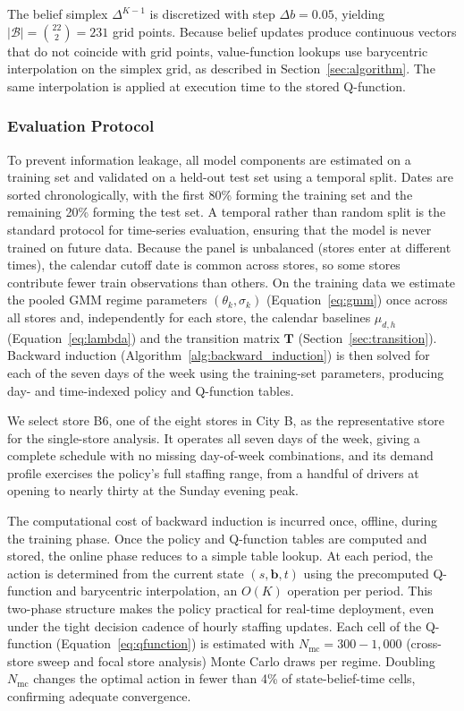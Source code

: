\documentclass[preprint,11pt,authoryear]{elsarticle}
\newcommand{\bvec}[1]{\mathbf{#1}}
\theoremstyle{remark}
\begin{document}
The belief simplex $\Delta^{K-1}$ is discretized with step $\Delta b = 0.05$, yielding $|\mathcal{B}| = \binom{22}{2} = 231$ grid points. Because belief updates produce continuous vectors that do not coincide with grid points, value-function lookups use barycentric interpolation on the simplex grid, as described in Section~\ref{sec:algorithm}. The same interpolation is applied at execution time to the stored Q-function.

\subsubsection{Evaluation Protocol}
\label{sec:Evaluation_protocol}

To prevent information leakage, all model components are estimated on a training set and validated on a held-out test set using a temporal split. Dates are sorted chronologically, with the first 80\% forming the training set and the remaining 20\% forming the test set. A temporal rather than random split is the standard protocol for time-series evaluation, ensuring that the model is never trained on future data. Because the panel is unbalanced (stores enter at different times), the calendar cutoff date is common across stores, so some stores contribute fewer train observations than others. On the
training data we estimate the pooled GMM regime parameters $(\theta_k, \sigma_k)$ (Equation~\ref{eq:gmm}) once across all stores and, independently for each store, the calendar baselines $\mu_{d,h}$ (Equation~\ref{eq:lambda}) and the transition matrix $\bvec{T}$ (Section~\ref{sec:transition}). Backward induction (Algorithm~\ref{alg:backward_induction}) is then solved for each of the seven days of the week using the training-set parameters, producing day- and time-indexed policy and Q-function tables.

We select store B6, one of the eight stores in City B, as the representative store for the single-store analysis. It operates all seven days of the week, giving a complete schedule with no missing day-of-week combinations, and its demand profile exercises the policy’s full staffing range, from a handful of drivers at opening to nearly thirty at the Sunday evening peak.

The computational cost of backward induction is incurred once, offline, during the training phase. Once the policy and Q-function tables are computed and stored, the online phase reduces to a simple table lookup. At each period, the action is determined from the current state $(s, \bvec{b}, t)$ using the precomputed Q-function and barycentric interpolation, an $O(K)$ operation per period. This two-phase structure makes the policy practical for real-time deployment, even under the tight decision cadence of hourly staffing updates. Each cell of the Q-function (Equation~\ref{eq:qfunction}) is estimated with $N_{\text{mc}} = 300-1{,}000$ (cross-store sweep and focal store analysis) Monte Carlo draws per regime. Doubling $N_{\text{mc}}$ changes the optimal action in fewer than 4\% of state-belief-time cells, confirming adequate convergence.
\end{document}
